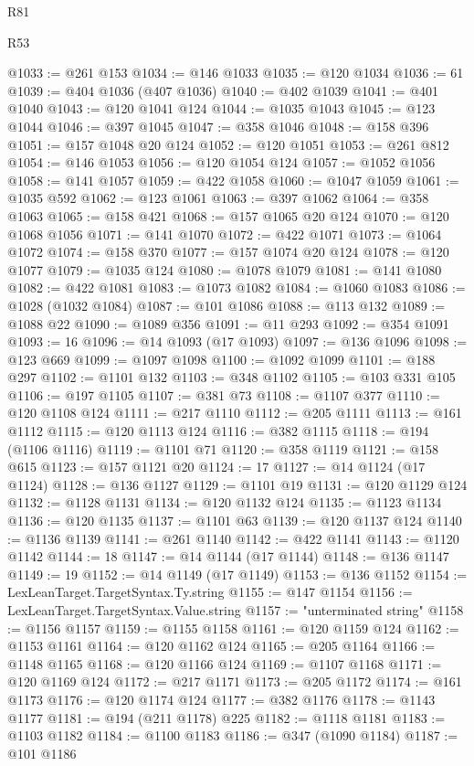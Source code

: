 \begin{lexlean}{R81}
\begin{lexlean}{R53}
\begin{coremodule}
{{{{{{{{{{{{{{{{{{{{{{{{{{{{{{{{{{{{{{{{{{{{{{{{{{{{{{{{{{{{{{{{{{{{{{{{{{{{{{{{{{{{{{{{{{{{{{{{{{{{{{{{{{{{{{{{@1033 := @261 @153
@1034 := @146 @1033
@1035 := @120 @1034
@1036 := 61
@1039 := @404 @1036 (@407 @1036)
@1040 := @402 @1039
@1041 := @401 @1040
@1043 := @120 @1041 @124
@1044 := @1035 @1043
@1045 := @123 @1044
@1046 := @397 @1045
@1047 := @358 @1046
@1048 := @158 @396
@1051 := @157 @1048 @20 @124
@1052 := @120 @1051
@1053 := @261 @812
@1054 := @146 @1053
@1056 := @120 @1054 @124
@1057 := @1052 @1056
@1058 := @141 @1057
@1059 := @422 @1058
@1060 := @1047 @1059
@1061 := @1035 @592
@1062 := @123 @1061
@1063 := @397 @1062
@1064 := @358 @1063
@1065 := @158 @421
@1068 := @157 @1065 @20 @124
@1070 := @120 @1068 @1056
@1071 := @141 @1070
@1072 := @422 @1071
@1073 := @1064 @1072
@1074 := @158 @370
@1077 := @157 @1074 @20 @124
@1078 := @120 @1077
@1079 := @1035 @124
@1080 := @1078 @1079
@1081 := @141 @1080
@1082 := @422 @1081
@1083 := @1073 @1082
@1084 := @1060 @1083
@1086 := @1028 (@1032 @1084)
@1087 := @101 @1086
@1088 := @113 @132
@1089 := @1088 @22
@1090 := @1089 @356
@1091 := @11 @293
@1092 := @354 @1091
@1093 := 16
@1096 := @14 @1093 (@17 @1093)
@1097 := @136 @1096
@1098 := @123 @669
@1099 := @1097 @1098
@1100 := @1092 @1099
@1101 := @188 @297
@1102 := @1101 @132
@1103 := @348 @1102
@1105 := @103 @331 @105
@1106 := @197 @1105
@1107 := @381 @73
@1108 := @1107 @377
@1110 := @120 @1108 @124
@1111 := @217 @1110
@1112 := @205 @1111
@1113 := @161 @1112
@1115 := @120 @1113 @124
@1116 := @382 @1115
@1118 := @194 (@1106 @1116)
@1119 := @1101 @71
@1120 := @358 @1119
@1121 := @158 @615
@1123 := @157 @1121 @20
@1124 := 17
@1127 := @14 @1124 (@17 @1124)
@1128 := @136 @1127
@1129 := @1101 @19
@1131 := @120 @1129 @124
@1132 := @1128 @1131
@1134 := @120 @1132 @124
@1135 := @1123 @1134
@1136 := @120 @1135
@1137 := @1101 @63
@1139 := @120 @1137 @124
@1140 := @1136 @1139
@1141 := @261 @1140
@1142 := @422 @1141
@1143 := @1120 @1142
@1144 := 18
@1147 := @14 @1144 (@17 @1144)
@1148 := @136 @1147
@1149 := 19
@1152 := @14 @1149 (@17 @1149)
@1153 := @136 @1152
@1154 := LexLeanTarget.TargetSyntax.Ty.string
@1155 := @147 @1154
@1156 := LexLeanTarget.TargetSyntax.Value.string
@1157 := "unterminated string"
@1158 := @1156 @1157
@1159 := @1155 @1158
@1161 := @120 @1159 @124
@1162 := @1153 @1161
@1164 := @120 @1162 @124
@1165 := @205 @1164
@1166 := @1148 @1165
@1168 := @120 @1166 @124
@1169 := @1107 @1168
@1171 := @120 @1169 @124
@1172 := @217 @1171
@1173 := @205 @1172
@1174 := @161 @1173
@1176 := @120 @1174 @124
@1177 := @382 @1176
@1178 := @1143 @1177
@1181 := @194 (@211 @1178) @225
@1182 := @1118 @1181
@1183 := @1103 @1182
@1184 := @1100 @1183
@1186 := @347 (@1090 @1184)
@1187 := @101 @1186
}}}}}}}}}}}}}}}}}}}}}}}}}}}}}}}}}}}}}}}}}}}}}}}}}}}}}}}}}}}}}}}}}}}}}}}}}}}}}}}}}}}}}}}}}}}}}}}}}}}}}}}}}}}}}}}}
\end{coremodule}
\end{lexlean}
\end{lexlean}
